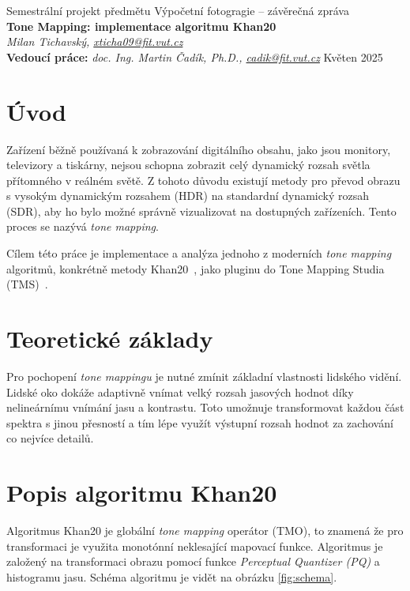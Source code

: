 \documentclass[11pt,a4paper,oneside]{article}
\begin{document}
\thispagestyle{empty}
\begin{center}
\vspace*{60mm}
{Semestrální projekt předmětu Výpočetní fotogragie -- závěrečná zpráva }\\
\smallskip
{\Large\bf Tone Mapping: implementace algoritmu Khan20}\\
\smallskip
{\it Milan Tichavský, \url{xticha09@fit.vut.cz}}\\
\vfill
{\bf Vedoucí práce:} {\it doc. Ing. Martin Čadík, Ph.D., \url{cadik@fit.vut.cz}} 
\hfill {Květen 2025}


\end{center}
\newpage


\section{Úvod}

Zařízení běžně používaná k zobrazování digitálního obsahu, jako jsou monitory,
televizory a tiskárny, nejsou schopna zobrazit celý dynamický rozsah světla
přítomného v reálném světě. Z tohoto důvodu existují metody pro převod obrazu s
vysokým dynamickým rozsahem (HDR) na standardní dynamický rozsah (SDR), aby ho bylo
možné správně vizualizovat na dostupných zařízeních. Tento proces se nazývá
\emph{tone mapping}.

Cílem této práce je implementace a analýza jednoho z moderních \emph{tone
mapping} algoritmů, konkrétně metody Khan20~\cite{Khan2020}, jako pluginu do Tone Mapping
Studia (TMS)~\cite{TMS2025}.

\section{Teoretické základy}

Pro pochopení \emph{tone mappingu} je nutné zmínit základní vlastnosti lidského
vidění. Lidské oko dokáže adaptivně vnímat velký rozsah jasových hodnot díky
nelineárnímu vnímání jasu a kontrastu. Toto umožnuje transformovat každou část
spektra s jinou přesností a tím lépe využít výstupní rozsah hodnot za zachování
co nejvíce detailů.

\section{Popis algoritmu Khan20}

Algoritmus Khan20 je globální \emph{tone mapping} operátor (TMO), to znamená že pro
transformaci je využita monotónní neklesající mapovací funkce. 
Algoritmus je založený na transformaci obrazu pomocí funkce \textit{Perceptual
Quantizer (PQ)} a histogramu jasu. Schéma algoritmu je vidět na obrázku
\ref{fig:schema}.
\end{document}
